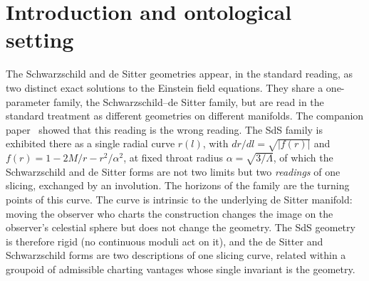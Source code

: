 \documentclass[11pt,a4paper]{article}
\theoremstyle{definition}
\begin{document}
\begin{abstract}
The construction accordingly carries three \emph{distinct} discrete operations, which must not be conflated: $\sigma$ (the Weyl, diagonal reflection---mass-invariant, Nariai-fixed, no branch-point crossing), $R$ (the diagram, anti-diagonal reflection---the vantage-swap, de~Sitter-fixed, the $r=0$ crossing), and $\xi$ (the partial involution at the throat seam). The first two generate $D_{6}$; the third is the analytic continuation joining the Riemannian and Lorentzian pieces of the slicing curve, its invertibility securing the correspondence's exactness.

We read the Schwarzschild description as the canonical asymmetric realisation---a partial arc swept, by an exterior vantage that cannot use the manifold's own axis of symmetry, about a selected off-axis point---and mark the scope of that reading explicitly: the attribution of the parting curvature term to the forced pivot rather than to the mass is the perspectival reading's interpretive payoff, not a claim proven independently of it. We close with where this paper's diagnostic reaches past the vacuum cuts, and with the mass question, which the companion settles: whether the throat radius is the intrinsic gravitational mass in the standard senses---the standard definitions return the slicing-dependent $M$, so $\alpha$ is the invariant curvature radius, a length rather than a mass.
\end{abstract}

\section{Introduction and ontological setting}\label{sec:intro}

The Schwarzschild and de Sitter geometries appear, in the standard reading, as two distinct exact solutions to the Einstein field equations. They share a one-parameter family, the Schwarzschild--de Sitter family, but are read in the standard treatment as different geometries on different manifolds. The companion paper~\cite{JanzenSlicing} showed that this reading is the wrong reading. The SdS family is exhibited there as a single radial curve $r(l)$, with $dr/dl=\sqrt{|f(r)|}$ and $f(r)=1-2M/r-r^{2}/\alpha^{2}$, at fixed throat radius $\alpha=\sqrt{3/\Lambda}$, of which the Schwarzschild and de Sitter forms are not two limits but two \emph{readings} of one slicing, exchanged by an involution. The horizons of the family are the turning points of this curve. The curve is intrinsic to the underlying de Sitter manifold: moving the observer who charts the construction changes the image on the observer's celestial sphere but does not change the geometry. The SdS geometry is therefore rigid (no continuous moduli act on it), and the de Sitter and Schwarzschild forms are two descriptions of one slicing curve, related within a groupoid of admissible charting vantages whose single invariant is the geometry.
\end{document}
